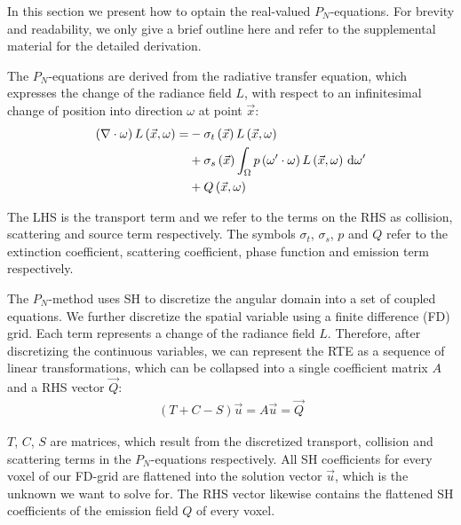 In this section we present how to optain the real-valued $P_N$-equations. For brevity and readability, we only give a brief outline here and refer to the supplemental material for the detailed derivation.

The $P_N$-equations are derived from the radiative transfer equation, which expresses the change of the radiance field $L$, with respect to an infinitesimal change of position into direction $\omega$ at point $\vec{x}$:
\begin{align}
\left(\nabla\cdot\omega\right)L\left(\vec{x}, \omega \right)
=&
-\sigma_t\left(\vec{x}\right) L\left(\vec{x}, \omega \right)\nonumber\\
&
+\sigma_s\left(\vec{x}\right) \int_{\Omega}
{
p\left(\omega'\cdot\omega\right)L\left(\vec{x}, \omega \right)\,\mathrm{d}\omega'
}\nonumber\\
&
+Q\left(\vec{x}, \omega\right)\nonumber
\end{align}

The LHS is the transport term and we refer to the terms on the RHS as collision, scattering and source term respectively. The symbols $\sigma_t$, $\sigma_s$, $p$ and $Q$ refer to the extinction coefficient, scattering coefficient, phase function and emission term respectively.

The $P_N$-method uses SH to discretize the angular domain into a set of coupled equations. We further discretize the spatial variable using a finite difference (FD) grid. Each term represents a change of the radiance field $L$. Therefore, after discretizing the continuous variables, we can represent the RTE as a sequence of linear transformations, which can be collapsed into a single coefficient matrix $A$ and a RHS vector $\vec{Q}$:
\begin{align}
(T+C-S)\vec{u} = A\vec{u} = \vec{Q}
\end{align}

$T$, $C$, $S$ are matrices, which result from the discretized transport, collision and scattering terms in the $P_N$-equations respectively. All SH coefficients for every voxel of our FD-grid are flattened into the solution vector $\vec{u}$, which is the unknown we want to solve for. The RHS vector likewise contains the flattened SH coefficients of the emission field $Q$ of every voxel.


\begin{figure}[h]
\centering
{}
\end{figure}

